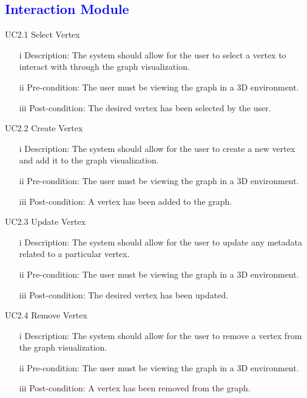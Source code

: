 \documentclass[12pt]{article}
\begin{document}
\bigskip

\textcolor{blue}{\subsection{Interaction Module}}
\begin{flushleft}
UC2.1 Select Vertex
\begin{itemize}
\item[i] Description: The system should allow for the user to select a vertex to interact with through the graph visualization. 
\item[ii] Pre-condition: The user must be viewing the graph in a 3D environment.
\item[iii] Post-condition: The desired vertex has been selected by the user.
\end{itemize}
\end{flushleft}

\bigskip
\begin{flushleft}
UC2.2 Create Vertex
\begin{itemize}
\item[i] Description: The system should allow for the user to create a new vertex and add it to the graph visualization.
\item[ii] Pre-condition: The user must be viewing the graph in a 3D environment.
\item[iii] Post-condition: A vertex has been added to the graph.
\end{itemize}
\end{flushleft}

\bigskip

\begin{flushleft}
UC2.3 Update Vertex
\begin{itemize}
\item[i] Description: The system should allow for the user to update any metadata related to a particular vertex.
\item[ii] Pre-condition: The user must be viewing the graph in a 3D environment.
\item[iii] Post-condition: The desired vertex has been updated.
\end{itemize}
\end{flushleft}

\bigskip

\begin{flushleft}
UC2.4 Remove Vertex
\begin{itemize}
\item[i] Description: The system should allow for the user to remove a vertex from the graph visualization.
\item[ii] Pre-condition: The user must be viewing the graph in a 3D environment.
\item[iii] Post-condition: A vertex has been removed from the graph.
\end{itemize}
\end{flushleft}
\bigskip
\end{document}
